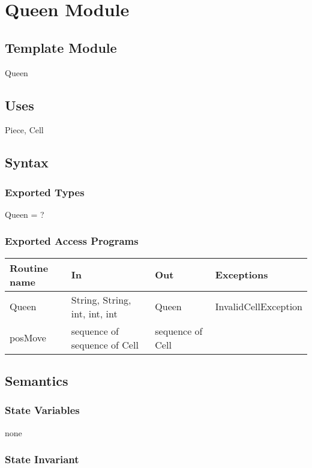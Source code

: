 \documentclass[12pt]{article}
\begin{document}
\section* {Queen Module}

\subsection*{Template Module}

Queen 

\subsection* {Uses}

Piece, Cell

\subsection* {Syntax}

\subsubsection* {Exported Types}

Queen = ?

\subsubsection* {Exported Access Programs}

\begin{tabular}{| l | l | l | l |}
\hline
\textbf{Routine name} & \textbf{In} & \textbf{Out} & \textbf{Exceptions}\\
\hline
Queen &String, String, int, int, int & Queen & InvalidCellException\\
\hline
posMove & sequence of sequence of Cell & sequence of Cell & ~\\
\hline
\end{tabular}

\subsection* {Semantics}

\subsubsection* {State Variables}

none

\subsubsection* {State Invariant}
\end{document}
